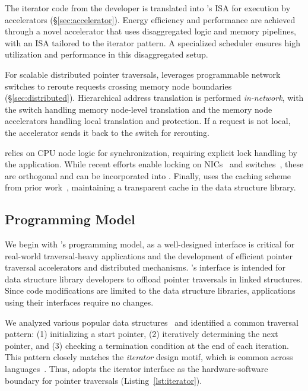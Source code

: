 The iterator code from the developer is translated into \pulse's ISA for execution by \pulse accelerators (\S\ref{sec:accelerator}). Energy efficiency and performance are achieved through a novel accelerator that uses disaggregated logic and memory pipelines, with an ISA tailored to the iterator pattern. A specialized scheduler ensures high utilization and performance in this disaggregated setup.

For scalable distributed pointer traversals, \pulse leverages programmable network switches to reroute requests crossing memory node boundaries (\S\ref{sec:distributed}). Hierarchical address translation is performed \emph{in-network}, with the switch handling memory node-level translation and the memory node accelerators handling local translation and protection. If a request is not local, the accelerator sends it back to the switch for rerouting.

 \pulse relies on CPU node logic for synchronization, requiring explicit lock handling by the application. While recent efforts enable locking on NICs~\cite{sherman, clover} and switches~\cite{netlock}, these are orthogonal and can be incorporated into \pulse. Finally, \pulse uses the caching scheme from prior work~\cite{aifm}, maintaining a transparent cache in the data structure library.



\subsection{\pulse Programming Model}
\label{ssec:interface}
We begin with \pulse's programming model, as a well-designed interface is critical for real-world traversal-heavy applications and the development of efficient pointer traversal accelerators and distributed mechanisms. \pulse's interface is intended for data structure library developers to offload pointer traversals in linked structures. Since code modifications are limited to the data structure libraries, applications using their interfaces require no changes.

We analyzed various popular data structures~\cite{stl, boost, javaiterator, c++iterator} and identified a common traversal pattern: (1) initializing a start pointer, (2) iteratively determining the next pointer, and (3) checking a termination condition at the end of each iteration. This pattern closely matches the \emph{iterator} design motif, which is common across languages~\cite{javaiterator}. Thus, \pulse adopts the iterator interface as the hardware-software boundary for pointer traversals (Listing~\ref{lst:iterator}).

